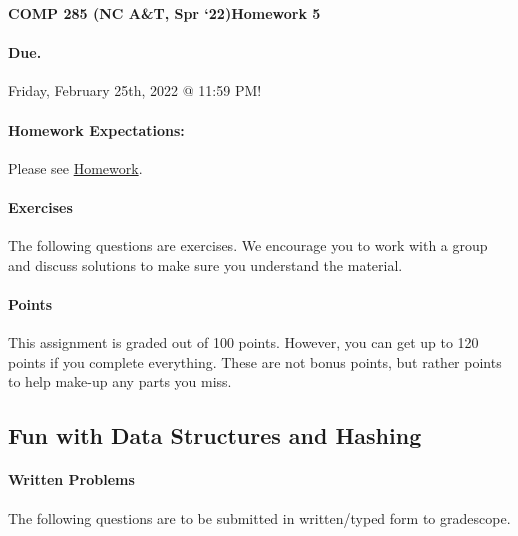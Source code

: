 \documentclass [12pt]{article}
\begin{document}
 

{\LARGE \textbf {COMP 285 (NC A\&T, Spr `22)}\hfill \textbf {Homework 5} } 
\vspace {1em} 
\begin{Instruction} 

\paragraph {Due.} Friday, February 25th, 2022 @ 11:59 PM!
\end{Instruction} 

\vspace {1em} 
\begin{Instruction} \paragraph {Homework Expectations:} Please see \href{https://www.comp285.ml/homework/#general-homework-information}{Homework}.
\end{Instruction}

\vspace {1em} 
\begin{Instruction} 

\paragraph {Exercises} The following questions are exercises. We encourage you to work with a group and discuss solutions to make sure you understand the material.

\paragraph {Points} This assignment is graded out of 100 points. However, you can get up to 120 points if you complete everything. These are not bonus points, but rather points to help make-up any parts you miss.

\end{Instruction} 

\begin{centering}
\section*{Fun with Data Structures and Hashing}
\end{centering}

\begin{Instruction}

\paragraph{Written Problems} The following questions are to be submitted in written/typed form to gradescope.

\end{Instruction}
\end{document}
